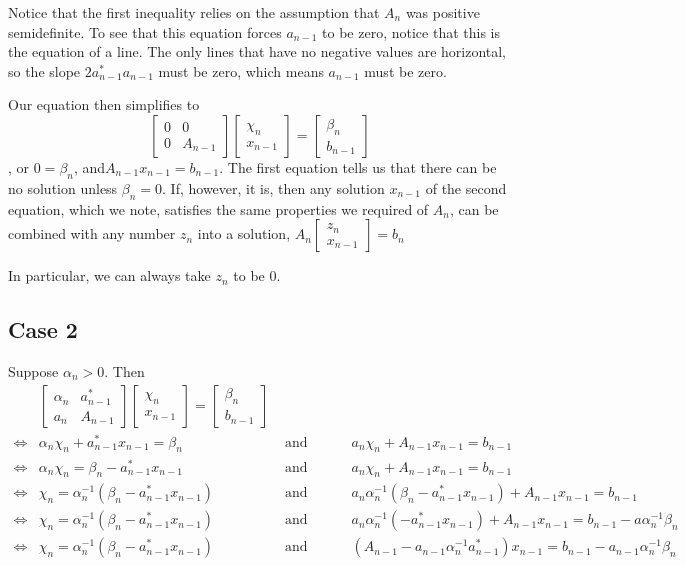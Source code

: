 \documentclass{article}
\newcommand{\bmat}[1]{\begin{bmatrix}#1\end{bmatrix}}
\begin{document}
Notice that the first inequality relies on the assumption that $A_n$ was
positive semidefinite. To see that this equation forces $a_{n-1}$ to be zero,
notice that this is the equation of a line. The only lines that have no negative
values are horizontal, so the slope $2a_{n-1}^*a_{n-1}$ must be zero, which means $a_{n-1}$ must
be zero.

Our equation then simplifies to 
$$\bmat{0 & 0 \\ 0 & A_{n-1}}\bmat{\chi_n\\x_{n-1}} =\bmat{\beta_n\\b_{n-1}}$$,
or $0=\beta_n$, and$A_{n-1}x_{n-1}=b_{n-1} $. The first equation tells us that
there can be no solution unless $\beta_n=0$. If, however, it is, then any
solution $x_{n-1}$ of the second equation, which we note, satisfies the same
properties we required of $A_n$, can be combined with any number $z_n$ into a
solution, $A_n\bmat{z_n\\x_{n-1}} = b_n$


In particular, we can always take $z_n$ to be 0.

\subsection{Case 2}
Suppose $\alpha_n>0$. Then
\begin{align*}
&\bmat{\alpha_n & a_{n-1}^* \\ a_n & A_{n-1}}\bmat{\chi_n\\x_{n-1}}=\bmat{\beta_n\\b_{n-1}}
\\\iff&
\alpha_n\chi_n + a_{n-1}^*x_{n-1} = \beta_n &\text{ and }\hspace{2em}&
a_n\chi_n + A_{n-1}x_{n-1} = b_{n-1}
\\\iff&
\alpha_n\chi_n= \beta_n - a_{n-1}^*x_{n-1}  &\text{ and }\hspace{2em}&
a_n\chi_n + A_{n-1}x_{n-1} = b_{n-1}
\\\iff&
\chi_n= \alpha_n^{-1}(\beta_n - a_{n-1}^*x_{n-1}) &\text{ and }\hspace{2em}&
a_n\alpha_n^{-1}(\beta_n - a_{n-1}^*x_{n-1}) + A_{n-1}x_{n-1} = b_{n-1}
\\\iff&
\chi_n= \alpha_n^{-1}(\beta_n - a_{n-1}^*x_{n-1}) &\text{ and }\hspace{2em}&
a_n\alpha_n^{-1}(- a_{n-1}^*x_{n-1}) + A_{n-1}x_{n-1} = b_{n-1}-a\alpha_n^{-1}\beta_n
\\\iff&
\chi_n= \alpha_n^{-1}(\beta_n - a_{n-1}^*x_{n-1}) &\text{ and }\hspace{2em}&
(A_{n-1} - a_{n-1}\alpha_n^{-1}a_{n-1}^*)x_{n-1} = b_{n-1}-a_{n-1}\alpha_n^{-1}\beta_n
\end{align*}
\end{document}
